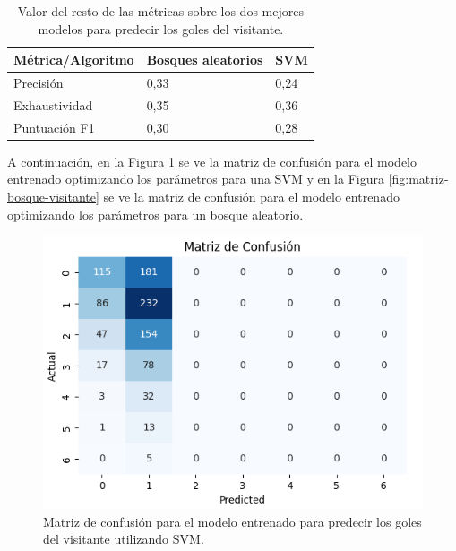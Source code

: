 \begin{table}[]
    \centering
    \begin{tabular}{|l|l|l|}
        \hline
        \rowcolor[HTML]{C0C0C0}
        Métrica/Algoritmo   & Bosques aleatorios & SVM  \\ \hline
        Precisión & 0,33               & 0,24 \\ \hline
        Exhaustividad    & 0,35               & 0,36 \\ \hline
        Puntuación F1  & 0,30               & 0,28 \\ \hline
    \end{tabular}
    \caption{Valor del resto de las métricas sobre los dos mejores modelos para predecir los goles del visitante.}
    \label{table:resto-metricas-visitante}
\end{table}

A continuación, en la Figura \ref{fig:matriz-svm-visitante} se ve la matriz de confusión para el modelo entrenado optimizando los parámetros para una SVM y en la Figura \ref{fig:matriz-bosque-visitante} se ve la matriz de confusión para el modelo entrenado optimizando los parámetros para un bosque aleatorio.

\begin{figure}[H]
    \centering
    \includegraphics[scale=0.60]{svg/matriz-svm-visitante.png}
    \caption{Matriz de confusión para el modelo entrenado para predecir los goles del visitante utilizando SVM. }
    \label{fig:matriz-svm-visitante}
\end{figure}

